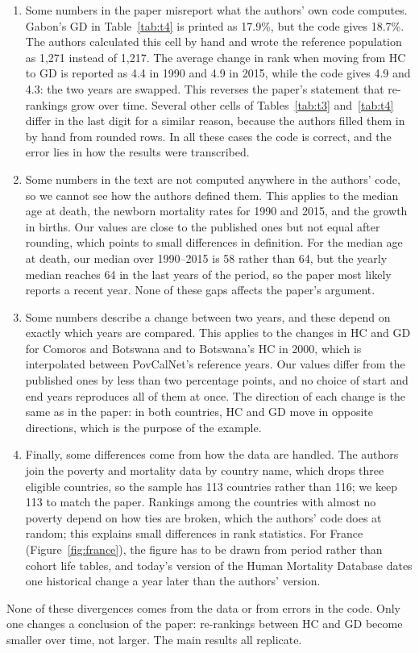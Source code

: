 \documentclass[12pt,a4paper]{article}
\begin{document}
\begin{enumerate}
  \item Some numbers in the paper misreport what the authors' own code computes. Gabon's GD in Table~\ref{tab:t4} is printed as 17.9\%, but the code gives 18.7\%. The authors calculated this cell by hand and wrote the reference population as 1,271 instead of 1,217. The average change in rank when moving from HC to GD is reported as 4.4 in 1990 and 4.9 in 2015, while the code gives 4.9 and 4.3: the two years are swapped. This reverses the paper's statement that re-rankings grow over time. Several other cells of Tables~\ref{tab:t3} and~\ref{tab:t4} differ in the last digit for a similar reason, because the authors filled them in by hand from rounded rows. In all these cases the code is correct, and the error lies in how the results were transcribed.

  \item Some numbers in the text are not computed anywhere in the authors' code, so we cannot see how the authors defined them. This applies to the median age at death, the newborn mortality rates for 1990 and 2015, and the growth in births. Our values are close to the published ones but not equal after rounding, which points to small differences in definition. For the median age at death, our median over 1990--2015 is 58 rather than 64, but the yearly median reaches 64 in the last years of the period, so the paper most likely reports a recent year. None of these gaps affects the paper's argument.

  \item Some numbers describe a change between two years, and these depend on exactly which years are compared. This applies to the changes in HC and GD for Comoros and Botswana and to Botswana's HC in 2000, which is interpolated between PovCalNet's reference years. Our values differ from the published ones by less than two percentage points, and no choice of start and end years reproduces all of them at once. The direction of each change is the same as in the paper: in both countries, HC and GD move in opposite directions, which is the purpose of the example.

  \item Finally, some differences come from how the data are handled. The authors join the poverty and mortality data by country name, which drops three eligible countries, so the sample has 113 countries rather than 116; we keep 113 to match the paper. Rankings among the countries with almost no poverty depend on how ties are broken, which the authors' code does at random; this explains small differences in rank statistics. For France (Figure~\ref{fig:france}), the figure has to be drawn from period rather than cohort life tables, and today's version of the Human Mortality Database dates one historical change a year later than the authors' version.
\end{enumerate}

None of these divergences comes from the data or from errors in the code. Only one changes a conclusion of the paper: re-rankings between HC and GD become smaller over time, not larger. The main results all replicate.
\end{document}
